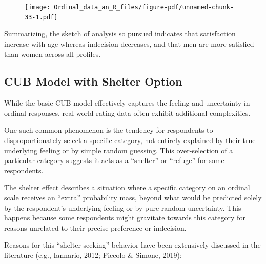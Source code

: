 \documentclass[
  letterpaper,
  DIV=11,
  numbers=noendperiod]{scrartcl}
\begin{document}
\begin{figure}[H]

{\centering \texttt{[image: Ordinal\_data\_an\_R\_files/figure-pdf/unnamed-chunk-33-1.pdf]}

}

\end{figure}

Summarizing, the sketch of analysis so pursued indicates that
satisfaction increase with age whereas indecision decreases, and that
men are more satisfied than women across all profiles.

\hypertarget{cub-model-with-shelter-option}{%
\subsection{CUB Model with Shelter
Option}\label{cub-model-with-shelter-option}}

While the basic CUB model effectively captures the feeling and
uncertainty in ordinal responses, real-world rating data often exhibit
additional complexities.

One such common phenomenon is the tendency for respondents to
disproportionately select a specific category, not entirely explained by
their true underlying feeling or by simple random guessing. This
over-selection of a particular category suggests it acts as a
``shelter'' or ``refuge'' for some respondents.

The shelter effect describes a situation where a specific category on an
ordinal scale receives an ``extra'' probability mass, beyond what would
be predicted solely by the respondent's underlying feeling or by pure
random uncertainty. This happens because some respondents might
gravitate towards this category for reasons unrelated to their precise
preference or indecision.

Reasons for this ``shelter-seeking'' behavior have been extensively
discussed in the literature (e.g., Iannario, 2012; Piccolo \& Simone,
2019):
\end{document}
